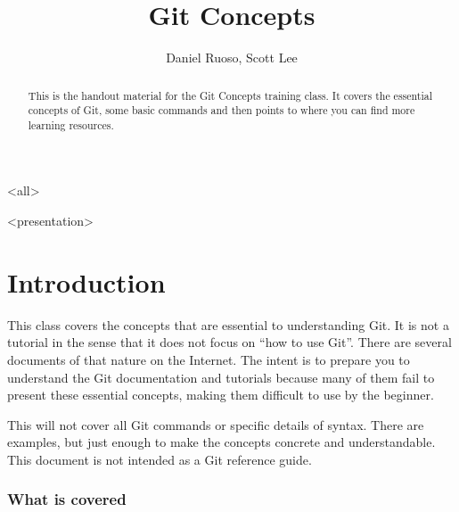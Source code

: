 \usepackage[english]{babel}
\usepackage{hyperref}
\usepackage{listings}

\title{Git Concepts}
\author{Daniel Ruoso, Scott Lee}

\mode<all>{\lstset{language=screensession}}

\maketitle
\begin{frame}<presentation>
  \titlepage
\end{frame}

\begin{abstract}
  This is the handout material for the Git Concepts training class. It
  covers the essential concepts of Git, some basic commands and then points to
  where you can find more learning resources.
\end{abstract}

\section{Introduction}

This class covers the concepts that are essential to understanding
Git.  It is not a tutorial in the sense that it does not focus on
``how to use Git''.  There are several documents of that nature on
the Internet. The intent is to prepare you to understand the Git
documentation and tutorials because many of them fail to present
these essential concepts, making them difficult to use by the
beginner.

This will not cover all Git commands or specific details of syntax.
There are examples, but just enough to make the concepts concrete
and understandable. This document is not intended as a Git reference
guide.

\begin{frame}[fragile]
  \label{WhatIsCovered}
  \frametitle{What is covered}


\end{frame}

